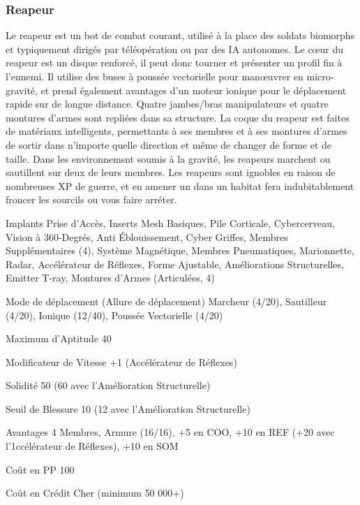 \subsubsection{Reapeur} \label{sec:starting-reaper} 

Le reapeur est un bot de combat courant, utilisé à la place des soldats biomorphs et typiquement dirigés par téléopération ou par des IA autonomes. Le cœur du reapeur est un disque renforcé, il peut donc tourner et présenter un profil fin à l'ennemi. Il utilise des buses à poussée vectorielle pour manœuvrer en micro-gravité, et prend également avantages d'un moteur ionique pour le déplacement rapide sur de longue distance. Quatre jambes/bras manipulateurs et quatre montures d'armes sont repliées dans sa structure. La coque du reapeur est faites de matériaux intelligents, permettants à ses membres et à ses montures d'armes de sortir dans n'importe quelle direction et même de changer de forme et de taille. Dans les environnemsnt soumis à la gravité, les reapeurs marchent ou sautillent sur deux de leurs membres. Les reapeurs sont ignobles en raison de nombreuses XP de guerre, et en amener un dans un habitat fera indubitablement froncer les sourcils ou vous faire arréter. 

\begin{description*}
   \item[Implants] Prise d'Accès, Inserts Mesh Basiques, Pile Corticale, Cybercerveau, Vision à 360-Degrés, Anti Éblouissement, Cyber Griffes, Membres Supplémentaires (4), Système Magnétique, Membres Pneumatiques, Marionnette, Radar, Accélérateur de Réflexes, Forme Ajustable, Améliorations Structurelles, Emitter T-ray, Montures d'Armes (Articulées, 4)
   \item[Mode de déplacement](Allure de déplacement) Marcheur (4/20), Sautilleur (4/20), Ionique (12/40), Poussée Vectorielle (4/20)
   \item[Maximum d'Aptitude] 40
   \item[Modificateur de Vitesse] +1 (Accélérateur de Réflexes)
   \item [Solidité] 50 (60 avec l'Amélioration Structurelle)
   \item[Seuil de Blessure] 10 (12 avec l'Amélioration Structurelle)
   \item[Avantages] 4 Membres, Armure (16/16), +5 en COO, +10 en REF (+20 avec l'1ccélérateur de Réflexes), +10 en SOM
   \item[Coût en PP] 100
   \item[Coût en Crédit] Cher (minimum 50 000+)
\end{description*} 

